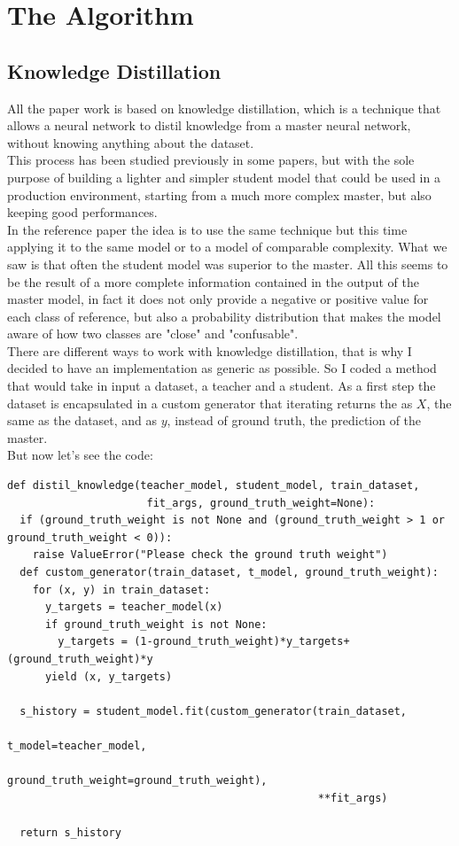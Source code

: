 \section{The Algorithm}
\subsection{Knowledge Distillation}
All the paper work is based on knowledge distillation, which is a technique that allows a neural network to distil knowledge from a master neural network, without knowing anything about the dataset.\\ 
This process has been studied previously in some papers\cite{kd}\cite{fokd}\cite{tkd}, but with the sole purpose of building a lighter and simpler student model that could be used in a production environment, starting from a much more complex master, but also keeping good performances.\\
In the reference paper the idea is to use the same technique but this time applying it to the same model or to a model of comparable complexity. What we saw is that often the student model was superior to the master. All this seems to be the result of a more complete information contained in the output of the master model, in fact it does not only provide a negative or positive value for each class of reference, but also a probability distribution that makes the model aware of how two classes are "close" and "confusable".\\
There are different ways to work with knowledge distillation, that is why I decided to have an implementation as generic as possible. So I coded a method that would take in input a dataset, a teacher and a student. As a first step the dataset is encapsulated in a custom generator that iterating returns the as $X$, the same as the dataset, and as $y$, instead of ground truth, the prediction of the master.\\
But now let's see the code:
\lstset{language=Python}
\lstset{frame=lines}
\lstset{basicstyle=\footnotesize}
\begin{lstlisting}
def distil_knowledge(teacher_model, student_model, train_dataset, 
                      fit_args, ground_truth_weight=None):
  if (ground_truth_weight is not None and (ground_truth_weight > 1 or ground_truth_weight < 0)):
    raise ValueError("Please check the ground truth weight")
  def custom_generator(train_dataset, t_model, ground_truth_weight):
    for (x, y) in train_dataset:
      y_targets = teacher_model(x)
      if ground_truth_weight is not None:
        y_targets = (1-ground_truth_weight)*y_targets+(ground_truth_weight)*y
      yield (x, y_targets)

  s_history = student_model.fit(custom_generator(train_dataset, 
                                                 t_model=teacher_model,
                                                 ground_truth_weight=ground_truth_weight),             
                                                 **fit_args)

  return s_history
\end{lstlisting}

